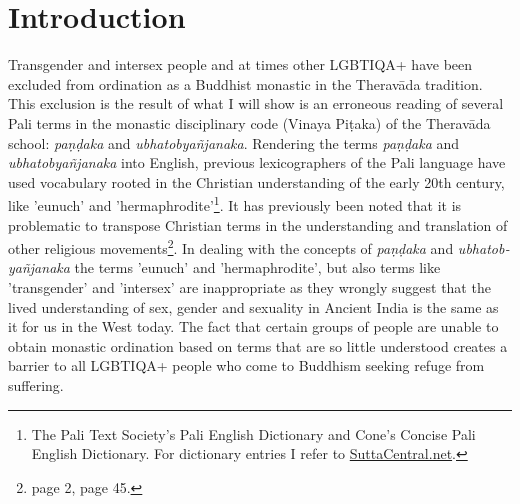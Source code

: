 \section{Introduction}
Transgender and intersex people and at times other LGBTIQA+ have been excluded from ordination as a Buddhist monastic in the Theravāda tradition. This exclusion is the result of what I will show is an erroneous reading of several Pali terms in the monastic disciplinary code (Vinaya Piṭaka) of the Theravāda school: {\em paṇḍaka} and {\em ubhatob­yañ­janaka}. Rendering the terms {\em paṇḍaka} and {\em ubhatob­yañ­janaka} into English, previous lexicographers of the Pali language have used vocabulary rooted in the Christian understanding of the early 20th century, like 'eunuch' and 'hermaphrodite'\footnote{The Pali Text Society's Pali English Dictionary and Cone's Concise Pali English Dictionary. For dictionary entries I refer to \href{https://suttacentral.net/}{SuttaCentral.net}.}. It has previously been noted that it is problematic to transpose Christian terms in the understanding and translation of other religious movements\footnote{\cite{maes} page 2, \cite{dudas} page 45.}. In dealing with the concepts of {\em paṇḍaka} and {\em ubhatob­yañ­janaka} the terms 'eunuch' and 'hermaphrodite', but also terms like 'transgender' and 'intersex' are inappropriate as they wrongly suggest that the lived understanding of sex, gender and sexuality in Ancient India is the same as it for us in the West today. The fact that certain groups of people are unable to obtain monastic ordination based on terms that are so little understood creates a barrier to all LGBTIQA+ people who come to Buddhism seeking refuge from suffering.

